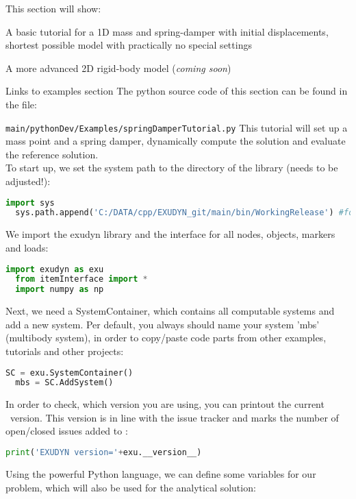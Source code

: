 

This section will show:
\bi
  \item A basic tutorial for a 1D mass and spring-damper with initial displacements, shortest possible model with practically no special settings
	\item A more advanced 2D rigid-body model ({\it coming soon})
	\item Links to examples section
\ei
%
The python source code of this section can be found in the file:
\bi
	\item[] \texttt{main/pythonDev/Examples/springDamperTutorial.py}
\ei
This tutorial will set up a mass point and a spring damper, dynamically compute the solution and evaluate the reference solution.
\vspace{6pt}\\
To start up, we set the system path to the directory of the library (needs to be adjusted!):
\pythonstyle
\begin{lstlisting}[language=Python, firstnumber=1]
  import sys 
  sys.path.append('C:/DATA/cpp/EXUDYN_git/main/bin/WorkingRelease') #for Spider
\end{lstlisting}
%
We import the exudyn library and the interface for all nodes, objects, markers and loads:
\begin{lstlisting}[language=Python, firstnumber=3]
  import exudyn as exu
  from itemInterface import *
  import numpy as np
\end{lstlisting}
%
Next, we need a SystemContainer, which contains all computable systems and add a new system.
Per default, you always should name your system 'mbs' (multibody system), in order to copy/paste code parts from other examples, tutorials and other projects:
\begin{lstlisting}[language=Python, firstnumber=6]
  SC = exu.SystemContainer()
  mbs = SC.AddSystem()
\end{lstlisting}
%
In order to check, which version you are using, you can printout the current \codeName\ version. This version is in line with the issue tracker and marks the number of open/closed issues added to \codeName :
\begin{lstlisting}[language=Python, firstnumber=8]
  print('EXUDYN version='+exu.__version__)
\end{lstlisting}
%
Using the powerful Python language, we can define some variables for our problem, which will also be used for the analytical solution:
